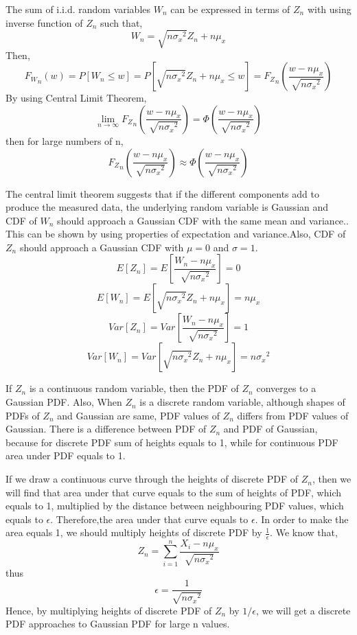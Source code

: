\documentclass[12pt,fleqn]{report}
\begin{document}
The sum of i.i.d. random variables $ W_n $ can be expressed in terms of $ Z_n $ with using inverse function of $Z_n$ such that, 
\begin{equation}
W_n = \sqrt{n{\sigma_x}^2}Z_n + n\mu_x
\end{equation}  
Then, 
\begin{equation}
 {F_W}_n(w) = P[W_n \leq w] = P[\sqrt{n{\sigma_x}^2}Z_n + n\mu_x \leq w]
  = {F_Z}_n\left(\frac{w-n\mu_x}{\sqrt{n{\sigma_x}^2}}\right) 
\end{equation}
By using Central Limit Theorem,
   $$
\lim_{n \rightarrow \infty} {F_Z}_n\left(\frac{w-n\mu_x}{\sqrt{n{\sigma_x}^2}}\right)=\Phi\left(\frac{w-n\mu_x}{\sqrt{n{\sigma_x}^2}}\right)
$$
then for large numbers of n,
\begin{equation}
{F_Z}_n\left(\frac{w-n\mu_x}{\sqrt{n{\sigma_x}^2}}\right) \approx \Phi\left(\frac{w-n\mu_x}{\sqrt{n{\sigma_x}^2}}\right)
\end{equation}


The central limit theorem suggests that if the different components add to produce the measured data, the underlying random variable is Gaussian and CDF of $W_n$ should approach a Gaussian CDF with the same mean and variance.\cite[pp. 249-250]{wiley}. This can be shown by using properties of expectation and variance.Also, CDF of $Z_n$ should approach a Gaussian CDF with $\mu=0$ and $\sigma=1$. 
$$
E[Z_n] = E[\frac{W_n - n \mu_x}{\sqrt{n {\sigma_x}^2}}] = 0 
$$
$$
E[W_n] = E[\sqrt{n {\sigma_x}^2}Z_n + n \mu_x] = n\mu_x
$$
$$
Var[Z_n] = Var[\frac{W_n - n \mu_x}{\sqrt{n {\sigma_x}^2}}] = 1
$$
$$
Var[W_n] = Var[\sqrt{n {\sigma_x}^2}Z_n + n \mu_x] = n {\sigma_x}^2
$$

If $Z_n$ is a continuous random variable, then the PDF of $Z_n$ converges to a Gaussian PDF. Also, When $Z_n$ is a discrete random variable, although shapes of PDFs of $Z_n$ and Gaussian are same, PDF values of $Z_n$ differs from PDF values of Gaussian. There is a difference between PDF of $Z_n$ and PDF of Gaussian, because for discrete PDF sum of heights equals to 1, while for continuous PDF area under PDF equals to 1. 

If we draw a continuous curve through the heights of discrete PDF of $Z_n$, then we will find that area under that curve equals to the sum of heights of PDF, which equals to 1, multiplied by the distance between neighbouring PDF values, which equals to $\epsilon $. Therefore,the area under that curve equals to $\epsilon$. In order to make the area equals 1, we should multiply heights of discrete PDF by $\frac{1}{\epsilon}$. We know that, $$ Z_n = \sum\limits_{i=1}^n \frac{X_i - n\mu_x}{\sqrt{n{\sigma_x}^2}} $$ thus $$ \epsilon = \frac{1}{\sqrt{n{\sigma_x}^2}} $$ Hence, by multiplying heights of discrete PDF of $Z_n$ by $1 / \epsilon $, we will get a discrete PDF approaches to Gaussian PDF for large n values. 
\end{document}
